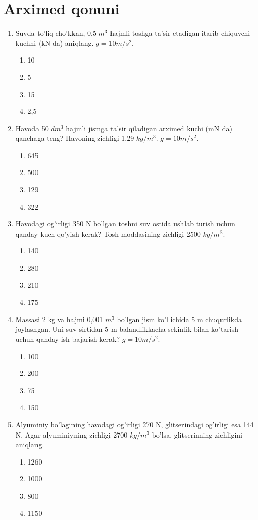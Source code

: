\section{Arximed qonuni}


\begin{enumerate}

\item Suvda to'liq cho'kkan, 0,5 $m^3$ hajmli toshga ta'sir etadigan itarib chiquvchi kuchni (kN da) aniqlang. $g=10m/s^2$.
\begin{enumerate}[label=\Alph*)]
\item 10
\item 5
\item 15
\item 2,5
\end{enumerate}

\item Havoda 50 $dm^3$ hajmli jismga ta'sir qiladigan arximed kuchi (mN da) qanchaga teng? Havoning zichligi 1,29 $kg/m^3$. $g=10m/s^2$.
\begin{enumerate}[label=\Alph*)]
\item 645
\item 500
\item 129
\item 322
\end{enumerate}

\item Havodagi og'irligi 350 N bo'lgan toshni suv ostida ushlab turish uchun qanday kuch qo'yish kerak? Tosh moddasining zichligi 2500 $kg/m^3$.
\begin{enumerate}[label=\Alph*)]
\item 140
\item 280
\item 210
\item 175
\end{enumerate}

\item Massasi 2 kg va hajmi 0,001 $m^3$ bo'lgan jism ko'l ichida 5 m chuqurlikda joylashgan. Uni suv sirtidan 5 m balandlikkacha sekinlik bilan ko'tarish uchun qanday ish bajarish kerak? $g=10m/s^2$.
\begin{enumerate}[label=\Alph*)]
\item 100
\item 200
\item 75
\item 150
\end{enumerate}

\item Alyuminiy bo'lagining havodagi og'irligi 270 N, glitserindagi og'irligi esa 144 N. Agar alyuminiyning zichligi 2700 $kg/m^3$ bo'lsa, glitserinning zichligini aniqlang.
\begin{enumerate}[label=\Alph*)]
\item 1260
\item 1000
\item 800
\item 1150
\end{enumerate}


\end{enumerate}

